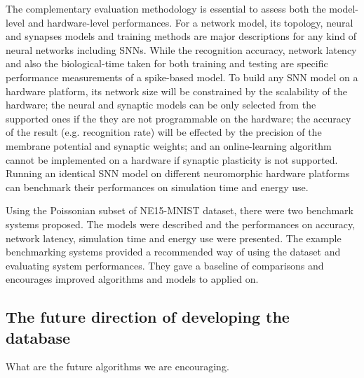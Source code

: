 The complementary evaluation methodology is essential to assess both the model-level and hardware-level performances.
For a network model, its topology, neural and synapses models and training methods are major descriptions for any kind of neural networks including SNNs.
While the recognition accuracy, network latency and also the biological-time taken for both training and testing are specific performance measurements of a spike-based model.
To build any SNN model on a hardware platform, its network size will be constrained by the scalability of the hardware;
the neural and synaptic models can be only selected from the supported ones if the they are not programmable on the hardware;
the accuracy of the result (e.g. recognition rate) will be effected by the precision of the membrane potential and synaptic weights;
and an online-learning algorithm cannot be implemented on a hardware if synaptic plasticity is not supported.
Running an identical SNN model on  different neuromorphic hardware platforms can benchmark their performances on simulation time and energy use.


Using the Poissonian subset of NE15-MNIST dataset, there were two benchmark systems proposed. 
The models were described and the performances on accuracy, network latency, simulation time and energy use were presented.
The example benchmarking systems provided a recommended way of using the dataset and evaluating system performances.
They gave a baseline of comparisons and encourages improved algorithms and models to applied on. 
\subsection{The future direction of developing the database}
What are the future algorithms we are encouraging.

